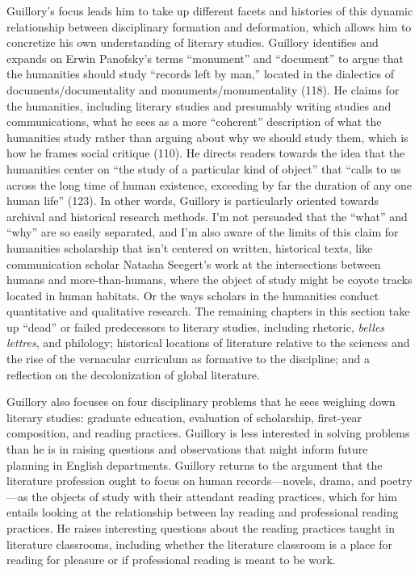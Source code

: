 \documentclass{tufte-handout}
\begin{document}
Guillory's focus leads him to take up different facets and histories of
this dynamic relationship between disciplinary formation and
deformation, which allows him to concretize his own understanding of
literary studies. Guillory identifies and expands on Erwin Panofsky's
terms ``monument'' and ``document'' to argue that the humanities should
study ``records left by man,'' located in the dialectics of
documents/documentality and monuments/monumentality (118). He claims for
the humanities, including literary studies and presumably writing
studies and communications, what he sees as a more ``coherent''
description of what the humanities study rather than arguing about why
we should study them, which is how he frames social critique (110). He
directs readers towards the idea that the humanities center on ``the
study of a particular kind of object'' that ``calls to us across the
long time of human existence, exceeding by far the duration of any one
human life'' (123). In other words, Guillory is particularly oriented
towards archival and historical research methods. I'm not persuaded that
the ``what'' and ``why'' are so easily separated, and I'm also aware of
the limits of this claim for humanities scholarship that isn't centered
on written, historical texts, like communication scholar Natasha
Seegert's work at the intersections between humans and more-than-humans,
where the object of study might be coyote tracks located in human
habitats. Or the ways scholars in the humanities conduct quantitative
and qualitative research. The remaining chapters in this section take up
``dead'' or failed predecessors to literary studies, including rhetoric,
\emph{belles lettres}, and philology; historical locations of literature
relative to the sciences and the rise of the vernacular curriculum as
formative to the discipline; and a reflection on the decolonization of
global literature.

Guillory also focuses on four disciplinary problems that he sees
weighing down literary studies: graduate education, evaluation of
scholarship, first-year composition, and reading practices. Guillory is
less interested in solving problems than he is in raising questions and
observations that might inform future planning in English departments.
Guillory returns to the argument that the literature profession ought to
focus on human records---novels, drama, and poetry---as the objects of
study with their attendant reading practices, which for him entails
looking at the relationship between lay reading and professional reading
practices. He raises interesting questions about the reading practices
taught in literature classrooms, including whether the literature
classroom is a place for reading for pleasure or if professional reading
is meant to be work.
\end{document}
